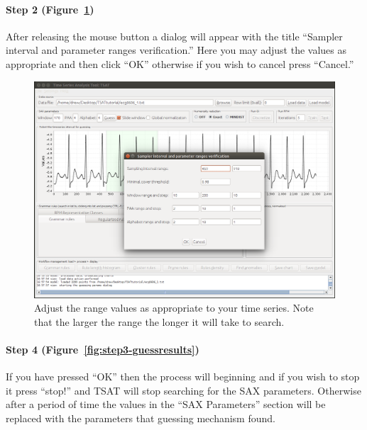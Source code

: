 \documentclass[titlepage, letterpaper, 12pt]{article}
\begin{document}
\paragraph{Step 2 (Figure~\ref{fig:step2-setrange})} After releasing the mouse button a dialog will appear with the title ``Sampler interval and parameter ranges verification.''  Here you may adjust the values as appropriate and then click ``OK'' otherwise if you wish to cancel press ``Cancel.''  

\begin{figure}[H]
	\centering
	\includegraphics[width=\textwidth]{pictures/motifguide/step2-setrange}
	\caption{Adjust the range values as appropriate to your time series.  Note that the larger the range the longer it will take to search. }
	\label{fig:step2-setrange}
\end{figure}


\paragraph{Step 4 (Figure~\ref{fig:step3-guessresults})} If you  have pressed ``OK'' then the process will beginning and if you wish to stop it press ``stop!'' and TSAT will stop searching for the SAX parameters.  Otherwise after a period of time the values in the ``SAX Parameters'' section will be replaced with the parameters that guessing mechanism found.
\end{document}
